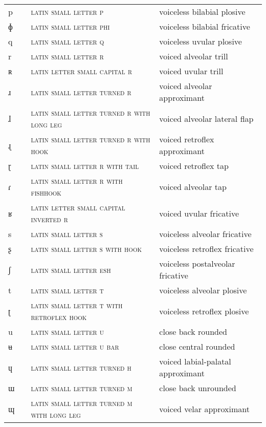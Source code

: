 \begin{center}
\begin{xtabular}{ l l L{4.5cm} L{4.5cm} }
p &  & \textsc{latin small letter p} & voiceless bilabial plosive \\ 
ɸ &  & \textsc{latin small letter phi} & voiceless bilabial fricative \\ 
q &  & \textsc{latin small letter q} & voiceless uvular plosive \\ 
r &  & \textsc{latin small letter r} & voiced alveolar trill \\ 
ʀ &  & \textsc{latin letter small capital r} & voiced uvular trill \\ 
ɹ &  & \textsc{latin small letter turned r} & voiced alveolar approximant \\ 
ɺ &  & \textsc{latin small letter turned r with long leg} & voiced alveolar lateral flap \\ 
ɻ &  & \textsc{latin small letter turned r with hook} & voiced retroflex approximant \\ 
ɽ &  & \textsc{latin small letter r with tail} & voiced retroflex tap \\ 
ɾ &  & \textsc{latin small letter r with fishhook} & voiced alveolar tap \\ 
ʁ &  & \textsc{latin letter small capital inverted r} & voiced uvular fricative \\ 
s &  & \textsc{latin small letter s} & voiceless alveolar fricative \\ 
ʂ &  & \textsc{latin small letter s with hook} & voiceless retroflex fricative \\ 
ʃ &  & \textsc{latin small letter esh} & voiceless postalveolar fricative \\ 
t &  & \textsc{latin small letter t} & voiceless alveolar plosive \\ 
ʈ &  & \textsc{latin small letter t with retroflex hook} & voiceless retroflex plosive \\ 
u &  & \textsc{latin small letter u} & close back rounded \\ 
ʉ &  & \textsc{latin small letter u bar} & close central rounded \\ 
ɥ &  & \textsc{latin small letter turned h} & voiced labial-palatal approximant \\ 
ɯ &  & \textsc{latin small letter turned m} & close back unrounded \\ 
ɰ &  & \textsc{latin small letter turned m with long leg} & voiced velar approximant \\ 

\end{xtabular}
\end{center}
